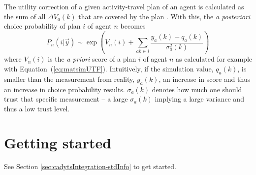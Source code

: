 The utility correction of a given activity-travel plan of an agent is calculated as the sum of all $\Delta V_a(k)$ that are covered by the plan \citep{FloetteroedChenEtAl2011BehavioralCalibAndAnaNETS}. With this, the \textit{a posteriori} choice probability of plan $i$ of agent $n$ becomes
\begin{equation}
P_n(i|\vec{y}) \sim \exp\left(V_n(i)+ \sum_{ak\in_{}i}   \frac{y_a(k)-q_a(k)}{\sigma^2_a(k)} \right)	
\label{eq:cadyts:selection}
\end{equation}
where $V_n(i)$ is the \textit{a priori} score of a plan $i$ of agent $n$ as calculated for example with Equation~(\ref{eq:matsimUTF}).
%
Intuitively, if the simulation value, $q_a(k)$, is smaller than the measurement from reality, $y_a(k)$, an increase in score and thus an increase in choice probability results. $\sigma_a(k)$ denotes how much one should trust that specific measurement -- a large $\sigma_a(k)$ implying a large variance and thus a low trust level.





\section{Getting started}

See Section \ref{sec:cadytsIntegration-stdInfo} to get started.





